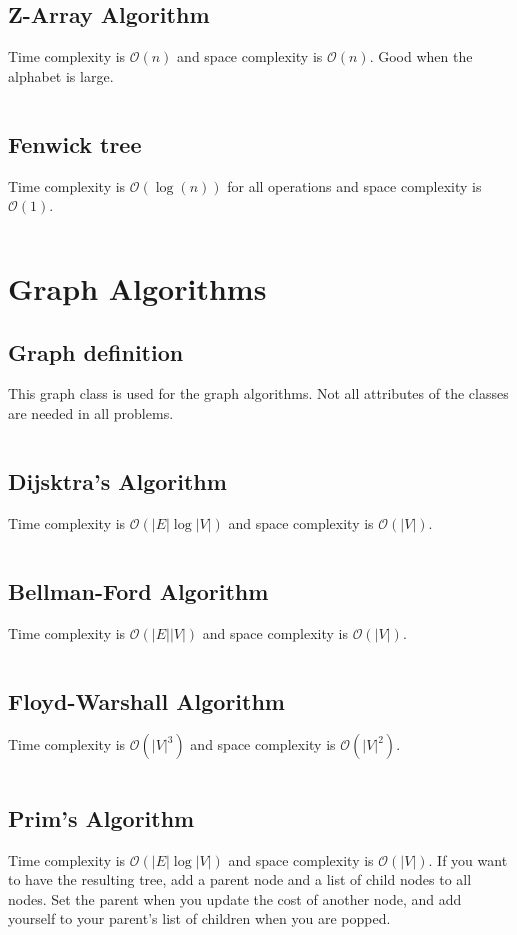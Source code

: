 \documentclass[8pt,a4paper,landscape,oneside]{amsart}
\newcommand{\code}[1]{\inputminted[fontsize=\normalsize,baselinestretch=1]{java}{code/#1}}
\newcommand{\bigO}{\mathcal{O}}
\begin{document}
\begin{multicols*}{3}
  \subsection{Z-Array Algorithm}
  Time complexity is $\bigO(n)$ and space complexity is $\bigO(n)$. Good when the alphabet is large.
  \code{Structures/ZArray.java}
  
  \subsection{Fenwick tree}
  Time complexity is $\bigO(\log(n))$ for all operations and space complexity is $\bigO(1)$.
  \code{Structures/Fenwick.java}
  
  
\section{Graph Algorithms}
  \subsection{Graph definition}
  This graph class is used for the graph algorithms. Not all attributes of the classes are needed in all problems.
  \code{Graphs/Graph.java}  
  \subsection{Dijsktra's Algorithm}
  Time complexity is $\bigO(|E| \log{|V|})$ and space complexity is $\bigO(|V|)$.
  \code{Graphs/Dijkstras.java}
  
  \subsection{Bellman-Ford Algorithm}
  Time complexity is $\bigO(|E||V|)$ and space complexity is $\bigO(|V|)$.
  \code{Graphs/BellmanFord.java}
  
  \subsection{Floyd-Warshall Algorithm}
  Time complexity is $\bigO(|V|^3)$ and space complexity is $\bigO(|V|^2)$.
  \code{Graphs/FloydWarshall.java}
  
  \subsection{Prim's Algorithm}
  Time complexity is $\bigO(|E| \log{|V|})$ and space complexity is $\bigO(|V|)$. If you want to have the resulting tree, add a parent node and a list of child nodes to all nodes. Set the parent when you update the cost of another node, and add yourself to your parent's list of children when you are popped.
  \code{Graphs/MST.java}
  

\end{multicols*}
\end{document}
